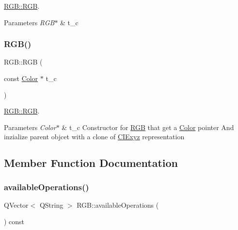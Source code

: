 \hyperlink{class_r_g_b_ab48fc0751f6432ff993b31119f289001}{R\+G\+B\+::\+R\+GB}. 


\begin{DoxyParams}{Parameters}
{\em R\+G\+B$\ast$} & t\+\_\+c \\
\hline
\end{DoxyParams}
\mbox{\label{class_r_g_b_acabd7e004d54445c5e87f27fcd06ad33}} 
\subsubsection{\texorpdfstring{R\+G\+B()}{RGB()}\hspace{0.1cm}{\footnotesize\ttfamily [4/4]}}
{\footnotesize\ttfamily R\+G\+B\+::\+R\+GB (\begin{DoxyParamCaption}\item[{const \hyperlink{class_color}{Color} $\ast$}]{t\+\_\+c }\end{DoxyParamCaption})}



\hyperlink{class_r_g_b_ab48fc0751f6432ff993b31119f289001}{R\+G\+B\+::\+R\+GB}. 


\begin{DoxyParams}{Parameters}
{\em Color$\ast$} & t\+\_\+c Constructor for \hyperlink{class_r_g_b}{R\+GB} that get a \hyperlink{class_color}{Color} pointer And inzialize parent objcet with a clone of \hyperlink{class_c_i_exyz}{C\+I\+Exyz} representation \\
\hline
\end{DoxyParams}


\subsection{Member Function Documentation}
\mbox{\label{class_r_g_b_a6cde5a9d00036c76fef2dd51ca8256a4}} 
\subsubsection{\texorpdfstring{available\+Operations()}{availableOperations()}}
{\footnotesize\ttfamily Q\+Vector$<$ Q\+String $>$ R\+G\+B\+::available\+Operations (\begin{DoxyParamCaption}{ }\end{DoxyParamCaption}) const\hspace{0.3cm}{\ttfamily [virtual]}}



